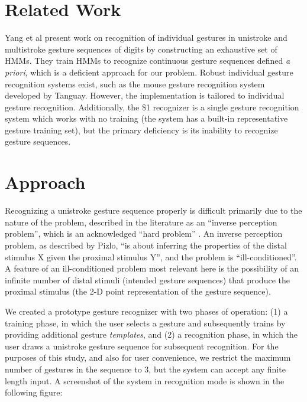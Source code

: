 \documentclass[twoside]{article}
\begin{document}
\begin{multicols}{2}
\section{Related Work}
Yang et al \cite{yang_gesture_1994} present work on recognition of individual
gestures in unistroke and multistroke gesture sequences of digits by
constructing an exhaustive set of HMMs. They train HMMs to recognize continuous
gesture sequences defined \textit{a priori}, which is a deficient approach for
our problem. Robust individual gesture recognition systems exist, such as the
mouse gesture recognition system developed by
Tanguay\cite{tanguay_jr_hidden_1995}. However, the implementation is tailored to
individual gesture recognition. Additionally, the \$1 recognizer
\cite{wobbrock2007gestures} is a single gesture recognition system which works
with no training (the system has a built-in representative gesture training
set), but the primary deficiency is its inability to recognize gesture
sequences.
\section{Approach}
Recognizing a unistroke gesture sequence properly is difficult primarily due to
the nature of the problem, described in the literature as an ``inverse
perception problem'', which is an acknowledged ``hard problem''
\cite{pizlo_perception_2001}. An inverse perception problem, as
described by Pizlo, ``is about inferring the properties of the distal stimulus X
given the proximal stimulus Y'', and the problem is ``ill-conditioned''. A
feature of an ill-conditioned problem most relevant here is the possibility of
an infinite number of distal stimuli (intended gesture sequences) that produce
the proximal stimulus (the 2-D point representation of the gesture sequence).

We created a prototype gesture recognizer with two phases of operation: (1) a
training phase, in which the user selects a gesture and subsequently trains by
providing additional gesture \emph{templates}, and (2) a recognition phase, in
which the user draws a unistroke gesture sequence for subsequent recognition.
For the purposes of this study, and also for user convenience, we restrict the
maximum number of gestures in the sequence to 3, but the system can accept any
finite length input. A screenshot of the system in recognition mode is shown in the following figure:


\end{multicols}
\end{document}
